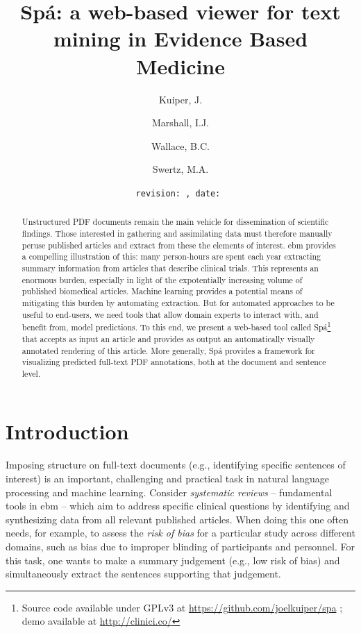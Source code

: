 \documentclass[runningheads,a4paper]{llncs}
\institute{
  University of Groningen P.O. Box 30001, 9700 RB Groningen \\ \mailsa
  \and King's College London, London SE1 3QD, UK \\ \mailsb
  \and Brown University, Providence, RI 02906, USA \\ \mailsc}
\begin{document}
\setcounter{tocdepth}{3}
\newcommand{\highlight}[1]{\colorbox{yellow}{#1}}


\author{Kuiper, J. \and Marshall, I.J. \and Wallace, B.C. \and Swertz, M.A.}
\date{\texttt{revision: \revision, date: \revisiondate}}
\title{Spá: a web-based viewer for text mining in Evidence Based Medicine}


\maketitle
\begin{abstract}
Unstructured PDF documents remain the main vehicle for dissemination of scientific findings.
Those interested in gathering and assimilating data must therefore manually peruse published articles and extract from these the elements of interest.
\acl{ebm} provides a compelling illustration of this: many person-hours are spent each year extracting summary information from articles that describe clinical trials.
This represents an enormous burden, especially in light of the expotentially increasing volume of published biomedical articles.
Machine learning provides a potential means of mitigating this burden by automating extraction.
But for automated approaches to be useful to end-users, we need tools that allow domain experts to interact with, and benefit from, model predictions.
To this end, we present a web-based tool called Spá\footnote{Source code available under GPLv3 at \url{https://github.com/joelkuiper/spa} \cite{kuiper2014}; demo available at \url{http://clinici.co/}} that accepts as input an article and provides as output an automatically visually annotated rendering of this article.
More generally, Spá provides a framework for visualizing predicted full-text PDF annotations, both at the document and sentence level.
\end{abstract}

\acresetall

\section{Introduction}
\label{section:intro}

Imposing structure on full-text documents (e.g., identifying specific sentences of interest) is an important, challenging and practical task in natural language processing and machine learning.
Consider \emph{systematic reviews} -- fundamental tools in \ac{ebm} \cite{sackett1996} -- which aim to address specific clinical questions by identifying and synthesizing data from all relevant published articles.
When doing this one often needs, for example, to assess the \emph{risk of bias} for a particular study across different domains, such as bias due to improper blinding of participants and personnel.
For this task, one wants to make a summary judgement (e.g., low risk of bias) and simultaneously extract the sentences supporting that judgement.
\end{document}
